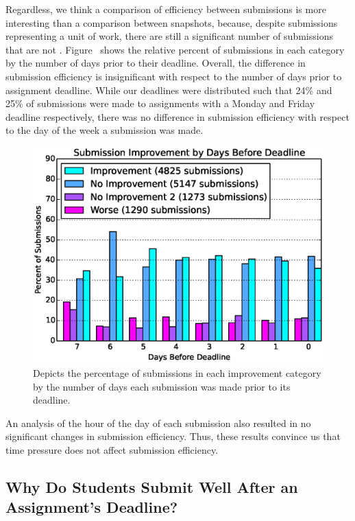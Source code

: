 Regardless, we think a comparison of efficiency between submissions is more
interesting than a comparison between snapshots, because, despite submissions
representing a unit of work, there are still a significant number of
submissions that are not \imp{}. Figure~ shows
the relative percent of submissions in each category by the number of days
prior to their deadline. Overall, the difference in submission efficiency is
insignificant with respect to the number of days prior to assignment
deadline. While our deadlines were distributed such that 24\% and 25\% of
submissions were made to assignments with a Monday and Friday deadline
respectively, there was no difference in submission efficiency with respect to
the day of the week a submission was made.

\begin{figure}[!t]
\centering
\includegraphics[width=5.25in]{graphs/Submission_Improvement_by_Days_Before_Deadline.eps}
\caption{Depicts the percentage of submissions in each improvement category by
  the number of days each submission was made prior to its deadline.}
\end{figure}

An analysis of the hour of the day of each submission also resulted in no
significant changes in submission efficiency. Thus, these results convince us
that time pressure does not affect submission efficiency.

\subsection{Why Do Students Submit Well After an Assignment's Deadline?}

